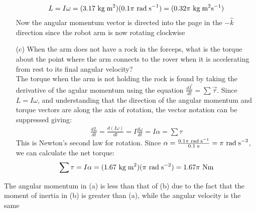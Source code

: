 \documentclass[a4paper]{article}
\newcommand\der[2]{\frac{d #1}{d #2}}
\newcommand\rads{\text{ rad\;s}^{-1}}
\newcommand\radss{\text{ rad\;s}^{-2}}
\newcommand\s{\text{ s}}
\newcommand\Nm{\text{ Nm}}
\newcommand\kgmm{\text{ kg\;m}^{2}}
\newcommand\kgmms{\text{ kg\;m}^2\text{s}^{-1}}
\begin{document}
\begin{shaded}
\begin{enumerate}
\begin{align*}
            L = I\omega = (3.17\kgmm)(0.1\pi\rads) = (0.32\pi\kgmms)
        \end{align*}
        Now the angular momentum vector is directed into the page in the $-\hat{k}$ direction since the robot arm is now rotating clockwise
        \item[(c)] When the arm does not have a rock in the forceps, what is the torque about the point where the arm connects to the rover when it is accelerating from rest to its final angular velocity?\\
        The torque when the arm is not holding the rock is found by taking the derivative of the agular momentum using the equation $\der{\vec{L}}{t} = \sum\vec{\tau}$. Since $L = I\omega$, and understanding that the direction of the angular momentum and torque vectors are along the axis of rotation, the vector notation can be suppressed giving:
        \begin{align*}
            \der{L}{t} = \der{(I\omega)}{t} = I\der{\omega}{t} = I\alpha = \sum\tau
        \end{align*}
        This is Newton's second law for rotation. Since $\alpha = \frac{0.1\pi\rads}{0.1\s} = \pi\radss$, we can calculate the net torque:
        \begin{align*}
            \sum\tau = I\alpha = (1.67\kgmm)(\pi\radss) = 1.67\pi\Nm
        \end{align*}
    \end{enumerate}
    The angular momentum in (a) is less than that of (b) due to the fact that the moment of inertia in (b) is greater than (a), while the angular velocity is the same
\end{shaded}
\newpage
\end{document}
